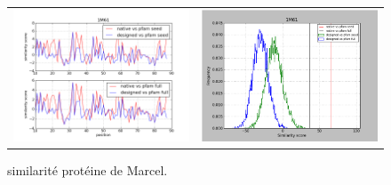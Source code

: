 \documentclass[a4paper,12pt]{article}
\begin{document}
\begin{figure}[t]
\begin{tabular}{cc}
       \includegraphics[width=8.45cm]{gen_08032012/1M61/ph/graph_simil_bypos.png} &
       \includegraphics[width=8.45cm]{gen_08032012/1M61/ph/graph_simil_byseq.png} \\


     \end{tabular}

     \caption{similarité protéine de Marcel.}
   \end{figure}
\end{document}
